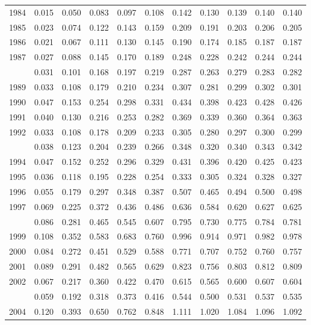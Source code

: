 \documentclass[
]{article}
\begin{document}
\begin{longtable}[t]{lrrrrrrrrrr}
1984 & 0.015 & 0.050 & 0.083 & 0.097 & 0.108 & 0.142 & 0.130 & 0.139 & 0.140 & 0.140\\
1985 & 0.023 & 0.074 & 0.122 & 0.143 & 0.159 & 0.209 & 0.191 & 0.203 & 0.206 & 0.205\\
1986 & 0.021 & 0.067 & 0.111 & 0.130 & 0.145 & 0.190 & 0.174 & 0.185 & 0.187 & 0.187\\
1987 & 0.027 & 0.088 & 0.145 & 0.170 & 0.189 & 0.248 & 0.228 & 0.242 & 0.244 & 0.244\\
\addlinespace
1988 & 0.031 & 0.101 & 0.168 & 0.197 & 0.219 & 0.287 & 0.263 & 0.279 & 0.283 & 0.282\\
1989 & 0.033 & 0.108 & 0.179 & 0.210 & 0.234 & 0.307 & 0.281 & 0.299 & 0.302 & 0.301\\
1990 & 0.047 & 0.153 & 0.254 & 0.298 & 0.331 & 0.434 & 0.398 & 0.423 & 0.428 & 0.426\\
1991 & 0.040 & 0.130 & 0.216 & 0.253 & 0.282 & 0.369 & 0.339 & 0.360 & 0.364 & 0.363\\
1992 & 0.033 & 0.108 & 0.178 & 0.209 & 0.233 & 0.305 & 0.280 & 0.297 & 0.300 & 0.299\\
\addlinespace
1993 & 0.038 & 0.123 & 0.204 & 0.239 & 0.266 & 0.348 & 0.320 & 0.340 & 0.343 & 0.342\\
1994 & 0.047 & 0.152 & 0.252 & 0.296 & 0.329 & 0.431 & 0.396 & 0.420 & 0.425 & 0.423\\
1995 & 0.036 & 0.118 & 0.195 & 0.228 & 0.254 & 0.333 & 0.305 & 0.324 & 0.328 & 0.327\\
1996 & 0.055 & 0.179 & 0.297 & 0.348 & 0.387 & 0.507 & 0.465 & 0.494 & 0.500 & 0.498\\
1997 & 0.069 & 0.225 & 0.372 & 0.436 & 0.486 & 0.636 & 0.584 & 0.620 & 0.627 & 0.625\\
\addlinespace
1998 & 0.086 & 0.281 & 0.465 & 0.545 & 0.607 & 0.795 & 0.730 & 0.775 & 0.784 & 0.781\\
1999 & 0.108 & 0.352 & 0.583 & 0.683 & 0.760 & 0.996 & 0.914 & 0.971 & 0.982 & 0.978\\
2000 & 0.084 & 0.272 & 0.451 & 0.529 & 0.588 & 0.771 & 0.707 & 0.752 & 0.760 & 0.757\\
2001 & 0.089 & 0.291 & 0.482 & 0.565 & 0.629 & 0.823 & 0.756 & 0.803 & 0.812 & 0.809\\
2002 & 0.067 & 0.217 & 0.360 & 0.422 & 0.470 & 0.615 & 0.565 & 0.600 & 0.607 & 0.604\\
\addlinespace
2003 & 0.059 & 0.192 & 0.318 & 0.373 & 0.416 & 0.544 & 0.500 & 0.531 & 0.537 & 0.535\\
2004 & 0.120 & 0.393 & 0.650 & 0.762 & 0.848 & 1.111 & 1.020 & 1.084 & 1.096 & 1.092\\

\end{longtable}
\end{document}

